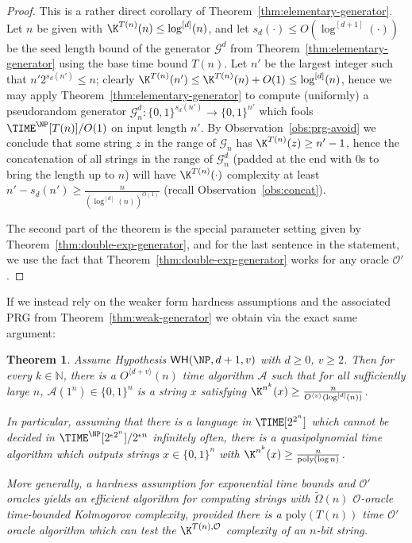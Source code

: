 \documentclass[11pt]{article}
\newtheorem{theorem}{Theorem}
\newcommand{\B}{\{0,1\}}
\newcommand{\od}[1]{O^{\langle #1 \rangle}}
\newcommand{\WH}{\mathsf{WH}}
\renewcommand{\poly}{\mathrm{poly}}
\begin{document}
\begin{proof}
This is a rather direct corollary of Theorem~\ref{thm:elementary-generator}. Let $n$ be given with $\K^{T(n)}(n) \leq \log^{[d]}(n)$, and let $s_d(\cdot) \leq O(\log^{[d+1]}(\cdot))$ be the seed length bound of the generator $\mathcal{G}^d$ from Theorem~\ref{thm:elementary-generator} using the base time bound $T(n)$. Let $n'$ be the largest integer such that $n'2^{s_d(n')} \leq n$; clearly $\K^{T(n)}(n') \leq \K^{T(n)}(n) + O(1) \leq \log^{[d]}(n)$, hence we may apply Theorem~\ref{thm:elementary-generator} to compute (uniformly) a pseudorandom generator $\mathcal{G}^d_n: \B^{s_d(n')} \to \B^{n'}$ which fools $\TIME^{\NP}[T(n)]/O(1)$ on input length $n'$. By Observation~\ref{obs:prg-avoid} we conclude that some string $z$ in the range of $\mathcal{G}_n$ has $\K^{T(n)}(z) \geq n'-1$, hence the concatenation of all strings in the range of $\mathcal{G}^d_n$ (padded at the end with $0$s to bring the length up to $n$) will have $\K^{T(n)}(\cdot)$ complexity at least $n' - s_d(n') \geq \frac{n}{(\log^{[d]}(n))^{O(1)}}$ (recall Observation~\ref{obs:concat}). 

The second part of the theorem is the special parameter setting given by Theorem~\ref{thm:double-exp-generator}, and for the last sentence in the statement, we use the fact that Theorem~\ref{thm:double-exp-generator} works for any oracle $\mathcal{O'}$.
\end{proof}

If we instead rely on the weaker form hardness assumptions and the associated PRG from Theorem~\ref{thm:weak-generator} we obtain via the exact same argument:
\begin{theorem}\label{thm:elementary-random-strings-weak}
Assume Hypothesis $\WH(\NP,d+1,v)$ with $d \geq 0$, $v \geq 2$. Then for every $k \in \mathbb{N}$, there is a $\od{d+v}(n)$ time algorithm $\mathcal{A}$ such that for all sufficiently large $n$, $\mathcal{A}(1^n) \in \B^n$  is a string $x$ satisfying $\K^{n^k}(x) \geq  \frac{n}{\od{v}(\log^{[d]}(n))}$.

In particular, assuming that there is a language in $\TIME[2^{2^n}]$ which cannot be decided in $\TIME^\NP[2^{\epsilon 2^n}]/2^{\epsilon n}$ infinitely often, there is a quasipolynomial time algorithm which outputs strings $x \in \B^n$ with $\K^{n^k}(x) \geq  \frac{n}{\poly(\log n)}$.

More generally, a hardness assumption for exponential time bounds and $\mathcal{O'}$ oracles yields an efficient algorithm for computing strings with $\tilde{\Omega}(n)$ $\mathcal{O}$-oracle time-bounded Kolmogorov complexity, provided there is a $\poly(T(n))$ time $\mathcal{O'}$ oracle algorithm which can test the $\K^{T(n), \mathcal{O}}$ complexity of an $n$-bit string.
\end{theorem}
\end{document}
